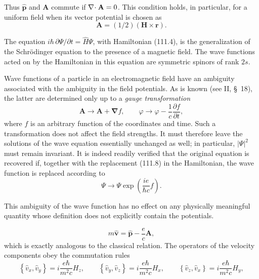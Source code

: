 Thus $\hat{\mathbf p}$ and $\mathbf A$ commute if $\nabla\!\cdot \mathbf A=0$. This
condition holds, in particular, for a uniform field when its vector potential
is chosen as
\begin{equation}
 \mathbf A=(1/2)(\mathbf H\times\mathbf r).
 \tag{111.7}
\end{equation}

The equation $i\hbar\,\partial\Psi/\partial t=\hat H\Psi$, with Hamiltonian
(111.4), is the generalization of the Schrödinger equation to the presence of
a magnetic field. The wave functions acted on by the Hamiltonian in this
equation are symmetric spinors of rank $2s$.

Wave functions of a particle in an electromagnetic field have an ambiguity
associated with the ambiguity in the field potentials. As is known (see II,
\S~18), the latter are determined only up to a \emph{gauge transformation}
\begin{equation}
 \mathbf A\to\mathbf A+\boldsymbol\nabla f,\qquad
 \varphi\to\varphi-\frac1c\frac{\partial f}{\partial t},
 \tag{111.8}
\end{equation}
where $f$ is an arbitrary function of the coordinates and time. Such a
transformation does not affect the field strengths. It must therefore leave
the solutions of the wave equation essentially unchanged as well; in
particular, $|\Psi|^2$ must remain invariant. It is indeed readily verified
that the original equation is recovered if, together with the replacement
(111.8) in the Hamiltonian, the wave function is replaced according to
\begin{equation}
 \Psi\to\Psi\exp\left(\frac{ie}{\hbar c}f\right).
 \tag{111.9}
\end{equation}

This ambiguity of the wave function has no effect on any physically
meaningful quantity whose definition does not explicitly contain the
potentials.


\begin{equation}
 m\hat{\mathbf v}=\hat{\mathbf p}-\frac ec\mathbf A,
 \tag{111.10}
\end{equation}
which is exactly analogous to the classical relation. The operators of the
velocity components obey the commutation rules
\begin{equation}
 \left\{\hat v_x,\hat v_y\right\}=i\frac{e\hbar}{m^2c}H_z,\qquad
 \left\{\hat v_y,\hat v_z\right\}=i\frac{e\hbar}{m^2c}H_x,\qquad
 \left\{\hat v_z,\hat v_x\right\}=i\frac{e\hbar}{m^2c}H_y,
 \tag{111.11}
\end{equation}


